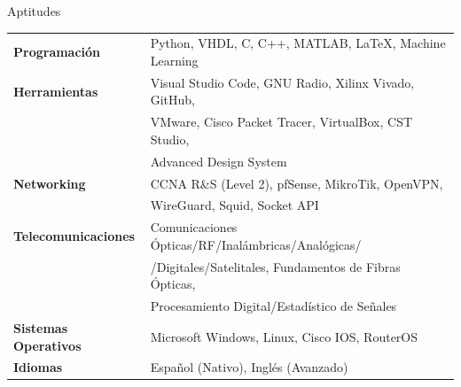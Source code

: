 \documentclass{resume} %
\begin{document}

\begin{rSection}{Aptitudes}

    \begin{tabular}{ @{} >{\bfseries}l @{\hspace{6ex}} l }
        Programación        & Python, VHDL, C, C++, MATLAB, \LaTeX, Machine Learning \\
        Herramientas        & Visual Studio Code, GNU Radio, Xilinx Vivado, GitHub,  \\ & VMware, Cisco Packet Tracer, VirtualBox, CST Studio, \\
                            & Advanced Design System                                 \\
        Networking          & CCNA R\&S (Level 2), pfSense, MikroTik, OpenVPN,       \\ & WireGuard, Squid, Socket API                                            \\
        Telecomunicaciones  & Comunicaciones Ópticas/RF/Inalámbricas/Analógicas/     \\ & /Digitales/Satelitales, Fundamentos de Fibras Ópticas, \\ & Procesamiento Digital/Estadístico de Señales \\
        Sistemas Operativos & Microsoft Windows, Linux, Cisco IOS, RouterOS          \\
        Idiomas             & Español (Nativo), Inglés (Avanzado)
    \end{tabular}

\end{rSection}
\end{document}
